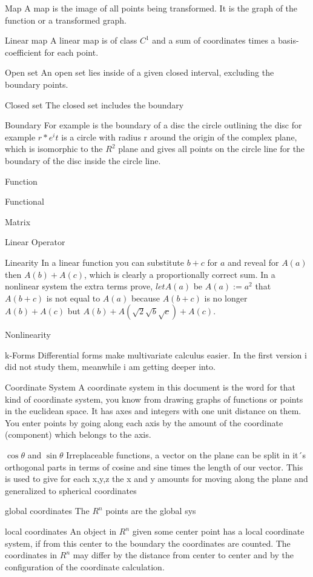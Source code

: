 \documentclass[a4paper]{article}
\begin{document}
\begin{description}
	\item{Map} A map is the image of all points being transformed. It is the graph of the function or a transformed graph.
	\item{Linear map} A linear map is of class $C^1$ and a sum of coordinates times a basis-coefficient for each point.
	\item{Open set} An open set lies inside of a given closed interval, excluding the boundary points.
	\item{Closed set} The closed set includes the boundary
	\item{Boundary} For example is the boundary of a disc the circle outlining the disc for example $r*e^it$ is a circle with radius r around the origin of the complex plane, which is isomorphic to the $R^2$ plane and gives all points on the circle line for the boundary of the disc inside the circle line.
	\item{Function}
	\item{Functional}
	\item{Matrix}
	\item{Linear Operator}
	\item{Linearity} In a linear function you can substitute $b+c$ for $a$ and reveal for $A(a)$ then $A(b) + A(c)$, which is clearly a proportionally correct sum. In a nonlinear system the extra terms prove, $let A(a)$ be $A(a) := a^2$ that $A(b+c)$ is not equal to $A(a)$ because $A(b+c)$ is no longer $A(b)+A(c)$ but $A(b)+A(\sqrt 2 \sqrt b \sqrt c)+A(c)$.
	\item{Nonlinearity} 
	
	\item{k-Forms} Differential forms make multivariate calculus easier. In the first version i did not study them, meanwhile i am getting deeper into.

	\item{Coordinate System} A coordinate system in this document is the word for that kind of coordinate system, you know from drawing graphs of functions or points in the euclidean space. It has axes and integers with one unit distance on them. You enter points by going along each axis by the amount of the coordinate (component) which belongs to the axis.

	\item{$\cos \theta$ and $\sin \theta$} Irreplaceable functions, a vector on the plane can be split in it´s orthogonal parts in terms of cosine and sine times the length of our vector. This is used to give for each x,y,z the x and y amounts for moving along the plane and generalized to spherical coordinates




	\item{global coordinates} The $R^n$ points are the global sys

	\item{local coordinates} An object in $R^n$ given some center point has a local coordinate system, if from this center to the boundary the coordinates are counted. The coordinates in $R^n$ may differ by the distance from center to center and by the configuration of the coordinate calculation.
\end{description}
\end{document}
